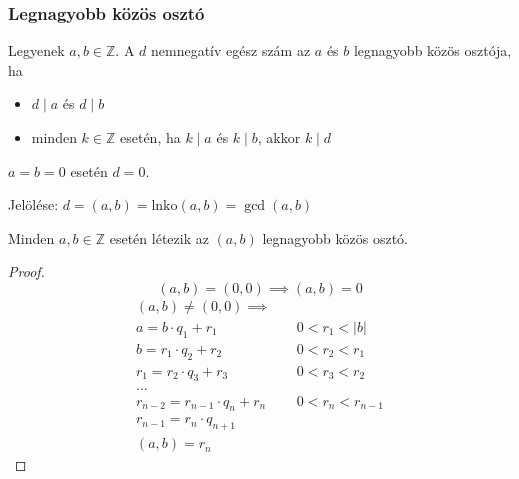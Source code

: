 \subsubsection{Legnagyobb közös osztó}
\begin{definition}
    Legyenek $a, b \in \mathbb{Z}$.
    A $d$ nemnegatív egész szám az $a$ és $b$ legnagyobb közös osztója, ha
    \begin{itemize}
        \item $d \mid a$ és $d \mid b$
        \item minden $k \in \mathbb{Z}$ esetén, ha $k \mid a$ és $k \mid b$,
        akkor $k \mid d$
    \end{itemize}
    $a = b = 0$ esetén $d = 0$.
\end{definition}
\begin{remark*}
    Jelölése: $d = (a, b) = \text{lnko}(a, b) = \gcd(a, b)$
\end{remark*}
\begin{theorem}
    Minden $a, b \in \mathbb{Z}$ esetén
    létezik az $(a, b)$ legnagyobb közös osztó.
\end{theorem}
\begin{proof}
    \begin{equation*}
        (a, b) = (0, 0) \implies (a, b) = 0
    \end{equation*}
    \begin{align*}
        (a, b) \neq (0, 0) \implies \\
        a = b \cdot q_1 + r_1 & \quad 0 < r_1 < |b| \\
        b = r_1 \cdot q_2 + r_2 & \quad 0 < r_2 < r_1 \\
        r_1 = r_2 \cdot q_3 + r_3 & \quad 0 < r_3 < r_2 \\
        \dots \\
        r_{n - 2} = r_{n - 1} \cdot q_n + r_n & \quad 0 < r_n < r_{n - 1} \\
        r_{n - 1} = r_n \cdot q_{n + 1} \\
        (a, b) = r_n
    \end{align*}
\end{proof}
